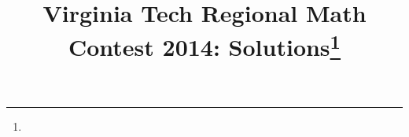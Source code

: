 \documentclass[10pt]{article}
\begin{document}
\title{Virginia Tech Regional Math Contest 2014: Solutions\footnote{\disclaimer}}
\author{\vspace{-2ex}}
\date{\vspace{-5ex}} %
\maketitle

%

%

%

%

%

%

%
\end{document}
